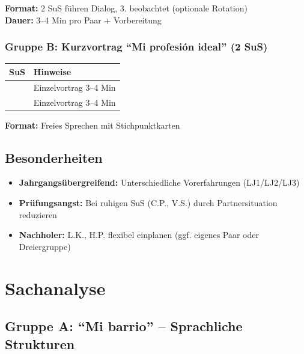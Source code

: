 \documentclass[11pt,a4paper]{article}
\begin{document}
\vspace{0.5em}
\textbf{Format:} 2 SuS führen Dialog, 3. beobachtet (optionale Rotation)\\
\textbf{Dauer:} 3--4 Min pro Paar + Vorbereitung

\subsubsection{Gruppe B: Kurzvortrag ``Mi profesión ideal'' (2 SuS)}

\begin{tabular}{|l|p{8cm}|}
\hline
\textbf{SuS} & \textbf{Hinweise} \\
\hline
[Name 1] & Einzelvortrag 3--4 Min \\
\hline
[Name 2] & Einzelvortrag 3--4 Min \\
\hline
\end{tabular}

\vspace{0.5em}
\textbf{Format:} Freies Sprechen mit Stichpunktkarten

\subsection{Besonderheiten}
\begin{itemize}
    \item \textbf{Jahrgangsübergreifend:} Unterschiedliche Vorerfahrungen (LJ1/LJ2/LJ3)
    \item \textbf{Prüfungsangst:} Bei ruhigen SuS (C.P., V.S.) durch Partnersituation reduzieren
    \item \textbf{Nachholer:} L.K., H.P. flexibel einplanen (ggf. eigenes Paar oder Dreiergruppe)
\end{itemize}

\section{Sachanalyse}

\subsection{Gruppe A: ``Mi barrio'' -- Sprachliche Strukturen}
\end{document}

